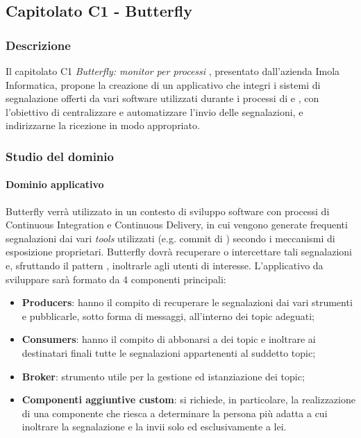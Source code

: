 	\subsection{Capitolato C1 - Butterfly}
	\subsubsection{Descrizione}
	Il capitolato C1 \emph{Butterfly: monitor per processi }, presentato dall'azienda Imola Informatica, propone la creazione di un applicativo che integri i sistemi di segnalazione offerti da vari software utilizzati durante i processi di  e , con l'obiettivo di centralizzare e automatizzare l'invio delle segnalazioni, e indirizzarne la ricezione in modo appropriato. 
	\subsubsection{Studio del dominio}
	\paragraph{Dominio applicativo} \Spazio
	Butterfly verrà utilizzato in un contesto di sviluppo software con processi di Continuous Integration e Continuous Delivery, in cui vengono generate frequenti segnalazioni dai vari \emph{tools} utilizzati (e.g. commit di ) secondo i  meccanismi di esposizione proprietari. Butterfly dovrà recuperare o intercettare tali segnalazioni e, sfruttando il pattern , inoltrarle agli utenti di interesse.
	L'applicativo da sviluppare sarà formato da 4 componenti principali:
	\begin{itemize}	 
		\item \textbf{{Producers}}: hanno il compito di recuperare le segnalazioni dai vari strumenti e pubblicarle, sotto forma di messaggi, all'interno dei
		topic adeguati;
		\item \textbf{{Consumers}}: hanno il compito di abbonarsi a dei topic e inoltrare ai destinatari finali tutte le segnalazioni
		appartenenti al suddetto topic;
		\item \textbf{{Broker}}: strumento utile per la gestione ed istanziazione dei topic;
		\item \textbf{{Componenti aggiuntive custom}}: si richiede, in particolare, la realizzazione di una componente che riesca a determinare la persona più adatta a cui inoltrare la segnalazione e la invii solo ed esclusivamente a lei.
	\end{itemize}

